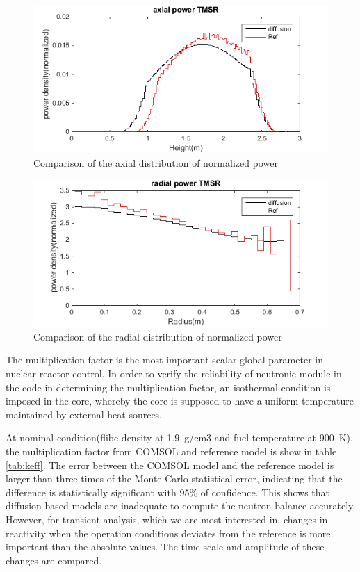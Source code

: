 \documentclass{elsarticle}
\begin{document}
\begin{figure}[ht]
  \centering
  \includegraphics[width=0.9\columnwidth]{./images/benchmark/axial_TMSR.png}
  \caption{Comparison of the axial distribution of normalized power}
  \label{fig:axial_power}
\end{figure}

\begin{figure}[ht]
  \centering
  \includegraphics[width=0.9\columnwidth]{./images/benchmark/radial_TMSR.png}
  \caption{Comparison of the radial distribution of normalized power}
  \label{fig:radial_power}
\end{figure}


The multiplication factor is the most important scalar global parameter in nuclear reactor control. In order to verify the reliability of neutronic module in the code in determining the multiplication factor, an isothermal condition is imposed in the core, whereby the core is supposed to have a uniform temperature maintained by external heat sources. 
 
At nominal condition(flibe density at 1.9~g/cm3 and fuel temperature at 900~K), the multiplication factor from COMSOL and reference model is show in table \ref{tab:keff}. The error between the COMSOL model and the reference model is larger than three times of the Monte Carlo statistical error, indicating that the difference is statistically significant with 95\% of confidence. This shows that diffusion based models are inadequate to compute the neutron balance accurately. However, for transient analysis, which we are most interested in, changes in reactivity when the operation conditions deviates from the reference is more important than the absolute values.
The time scale and amplitude of these changes are compared.
\end{document}
